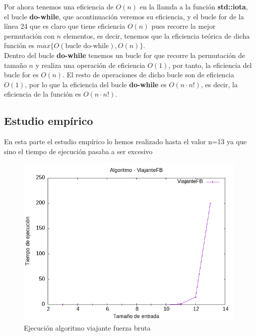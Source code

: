 \documentclass[11pt,openany]{book}
\begin{document}
Por ahora tenemos una eficiencia de $O(n)$ en la llamda a la función \textbf{std::iota}, el bucle \textbf{do-while}, que acontinuación veremos su eficiencia, y el
bucle for de la línea 24 que es claro que tiene eficiencia $O(n)$ pues recorre la mejor permutación con $n$ elementos, es decir, tenemos que la eficiencia teórica
de dicha función es $max\{O(\text{bucle do-while}), O(n)\}$. \\
Dentro del bucle \textbf{do-while} tenemos un bucle for que recorre la permutación de tamaño $n$ y realiza una operación de eficiencia $O(1)$, por tanto, la eficiencia
del bucle for es $O(n)$. El resto de operaciones de dicho bucle son de eficiencia $O(1)$, por lo que la eficiencia del bucle \textbf{do-while} es $O(n\cdot n!)$, es decir,
la eficiencia de la función es $O(n\cdot n!)$.
\subsection{Estudio empírico}
En esta parte el estudio empírico lo hemos realizado hasta el valor n=13 ya que sino el tiempo de ejecución pasaba a ser excesivo
\begin{center}
      \begin{figure}[H]
            \centering
            \includegraphics[width=0.7\linewidth]{assets/Img/ViajanteFB.png}
            \caption{Ejecución algoritmo viajante fuerza bruta}
            \label{fig:ViajanteFB}
      \end{figure}
\end{center}
\end{document}
